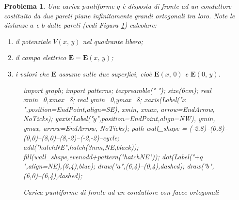 \documentclass[b5paper,twoside]{book}
\newtheorem{problema}{Problema}
\let\oldhat\hat
\renewcommand{\vec}[1]{\mathbf{#1}}
\renewcommand{\hat}[1]{\widehat{\mathbf{#1}}}
\begin{document}
\begin{problema}
	Una carica puntiforme $q$ è disposta di fronte ad un conduttore costituito da due pareti
	piane infinitamente grandi ortogonali tra loro. Note le distanze $a$ e $b$ dalle pareti
	(vedi Figura \ref{fig:conduttori_ortogonali}) calcolare:
	\begin{enumerate}
		\item il potenziale $V(x,\,y)$ nel quadrante libero;
		\item il campo elettrico $\vec{E} = \vec{E}(x,\,y)$;
		\item i valori che $\vec{E}$ assume sulle due superfici, cioè $\vec{E}(x,\,0)$
		e $\vec{E}(0,\,y)$.
	\end{enumerate}
	\begin{figure}[H]
		\centering
		\begin{asy}
			import graph;
			import patterns;
			texpreamble("\let\oldhat\hat
			\renewcommand{\vec}[1]{\mathbf{#1}}
			\renewcommand{\hat}[1]{\oldhat{\mathbf{#1}}}");
			size(6cm);
			real xmin=0,xmax=8;
			real ymin=0,ymax=8;
			xaxis(Label("\small $x$",position=EndPoint,align=SE),
			xmin, xmax, arrow=EndArrow, NoTicks);
			yaxis(Label("\small $y$",position=EndPoint,align=NW),
			ymin, ymax, arrow=EndArrow, NoTicks);
			path wall_shape = (-2,8)--(0,8)--(0,0)--(8,0)--(8,-2)--(-2,-2)--cycle;
			add("hatchNE",hatch(3mm,NE,black));
			fill(wall_shape,evenodd+pattern("hatchNE"));
			dot(Label("\small $+q$",align=NE),(6,4),blue);
			draw("\small $a$",(6,4)--(0,4),dashed);
			draw("\small $b$",(6,0)--(6,4),dashed);
		\end{asy}
		\caption{Carica puntiforme di fronte ad un conduttore con facce ortogonali}
		\label{fig:conduttori_ortogonali}
	\end{figure}
\end{problema}
\end{document}
